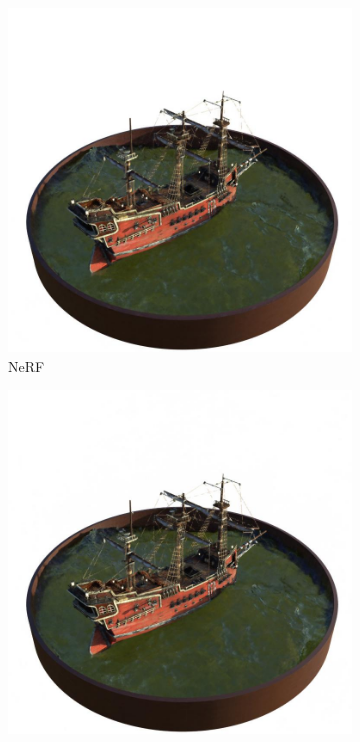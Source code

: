 \documentclass[12pt, a4paper, twoside]{book}
\numberwithin{equation}{chapter}
\numberwithin{theorem}{section}
\numberwithin{definition}{section}
\numberwithin{definitionChapter}{chapter}
\begin{document}
\begin{figure}[H]
\begin{subfigure}{0.475\textwidth}
			\includegraphics[scale=0.25]{img/nerf/nerf_ship_38.jpg}
			\caption{NeRF}
		\end{subfigure}
		\begin{subfigure}{0.475\textwidth}
			\centering
			\includegraphics[scale=0.25]{img/mipnerf/mipnerf_ship_38.jpg}

\end{subfigure}
\end{figure}
\end{document}
